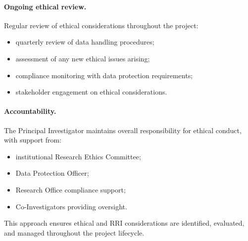 \paragraph{Ongoing ethical review.}
Regular review of ethical considerations throughout the project:
\begin{itemize}
  \item quarterly review of data handling procedures;
  \item assessment of any new ethical issues arising;
  \item compliance monitoring with data protection requirements;
  \item stakeholder engagement on ethical considerations.
\end{itemize}

\paragraph{Accountability.}
The Principal Investigator maintains overall responsibility for ethical conduct, with support from:
\begin{itemize}
  \item institutional Research Ethics Committee;
  \item Data Protection Officer;
  \item Research Office compliance support;
  \item Co-Investigators providing oversight.
\end{itemize}

This approach ensures ethical and RRI considerations are identified, evaluated, and managed throughout the project lifecycle.

